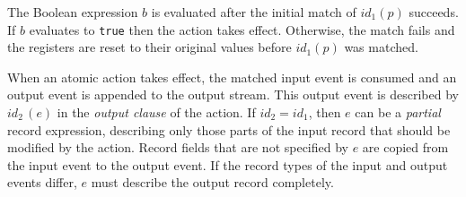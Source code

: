 The Boolean expression $b$ is evaluated after the initial match of $\mathit{id}_1(p)$ succeeds. If $b$ evaluates to \lstinline+true+ then the action takes effect. Otherwise, the match fails and the registers are reset to their original values before $\mathit{id}_1(p)$ was matched.

When an atomic action takes effect, the matched input event is consumed and an output event is appended to the output stream. This output event is described by $\mathit{id}_2\,(e)$ in the \emph{output clause} of the action. If $\mathit{id}_2=\mathit{id}_1$, then $e$ can be a \emph{partial} record expression, describing only those parts of the input record that should be modified by the action. Record fields that are not specified by $e$ are copied from the input event to the output event. If the record types of the input and output events differ, $e$ must describe the output record completely.


